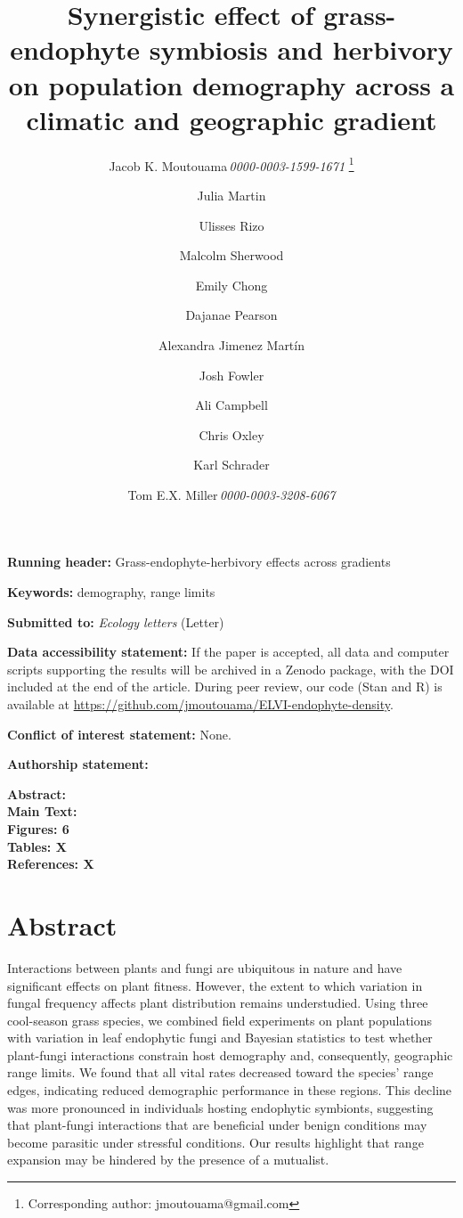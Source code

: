 \documentclass[12pt]{article}\usepackage[]{graphicx}\usepackage[dvipsnames]{xcolor}
\title{Synergistic effect of grass-endophyte symbiosis and herbivory on population demography across a climatic and geographic gradient}
\author[1]{Jacob K. Moutouama\,\textit{0000-0003-1599-1671} \thanks{Corresponding author: jmoutouama@gmail.com}}
\author[1]{Julia Martin}
\author[1]{Ulisses Rizo}
\author[1]{Malcolm Sherwood}
\author[1]{Emily Chong}
\author[1]{Dajanae Pearson}
\author[1]{Alexandra Jimenez Martín}
\author[2]{Josh Fowler}
\author[1]{Ali Campbell}
\author[1]{Chris Oxley}
\author[1]{Karl Schrader}
\author[1]{Tom E.X. Miller\,\textit{0000-0003-3208-6067}}
\affil[1]{Program in Ecology and Evolutionary Biology, Department of BioSciences, Rice University, Houston, TX USA}
\affil[2]{University of Miami, Department of Biology, Miami, FL USA}
\date{} %
\begin{document}
\renewcommand{\baselinestretch}{1.2}
\maketitle
\noindent\textbf{Running header:} Grass-endophyte-herbivory effects across gradients
\bigskip 

\noindent\textbf{Keywords:} demography, range limits

\bigskip 
\noindent\textbf{Submitted to:} \textit{Ecology letters} (Letter)

\bigskip 
\noindent\textbf{Data accessibility statement:} 
If the paper is accepted, all data and computer scripts supporting the results will be archived in a Zenodo package, with the DOI included at the end of the article. 
During peer review, our code (Stan and R) is available at \url{https://github.com/jmoutouama/ELVI-endophyte-density}. 

\bigskip 
\noindent\textbf{Conflict of interest statement:} None.

\bigskip
\noindent\textbf{Authorship statement:}

\bigskip
\noindent\textbf{Abstract:}\\
\noindent\textbf{Main Text:}\\
\noindent\textbf{Figures: 6}\\
\noindent\textbf{Tables: X}\\
\noindent\textbf{References: X}

\newpage
\linenumbers
\section*{Abstract}
Interactions between plants and fungi are ubiquitous in nature and have significant effects on plant fitness.
However, the extent to which variation in fungal frequency affects plant distribution remains understudied. 
Using three cool-season grass species, we combined field experiments on plant populations with variation in leaf endophytic fungi and Bayesian statistics to test whether plant-fungi interactions constrain host demography and, consequently, geographic range limits. 
We found that all vital rates decreased toward the species' range edges, indicating reduced demographic performance in these regions. 
This decline was more pronounced in individuals hosting endophytic symbionts, suggesting that plant-fungi interactions that are beneficial under benign conditions may become parasitic under stressful conditions.
Our results highlight that range expansion may be hindered by the presence of a mutualist.
\end{document}
